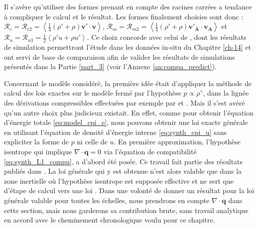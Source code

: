 Il s'avère qu'utiliser des formes prenant en compte des racines carrées a tendance à compliquer le calcul et le résultat. Les formes finalement choisies sont donc : $\mathcal{R}_{c} = \mathcal{R}_{c2} = \left<\frac{1}{4} \left(\rho'+\rho\right) \boldsymbol{v'} \cdot  \boldsymbol{v} \right>$, $\mathcal{R}_{m} = \mathcal{R}_{m2} = \left<\frac{1}{4} \left(\rho'+\rho\right) \boldsymbol{v'_A} \cdot  \boldsymbol{v_A} \right>$ et $\mathcal{R}_{u} = \mathcal{R}_{u3} = \frac{1}{2}\left< \rho' u + \rho u'\right> $. Ce choix concorde avec celui de \cite{andres_energy_2018}, dont les résultats de simulation permettront l'étude dans les données in-situ du Chapitre \ref{ch-14} et ont servi de base de comparaison afin de valider les résultats de simulations présentés dans la Partie \ref{part_3} (voir l'Annexe \ref{an:compa_predict}).

Concernant le modèle considéré, la première idée était d'appliquer la méthode de calcul des lois exactes sur le modèle fermé par l'hypothèse $p \propto \rho^{\gamma}$, dans la lignée des dérivations compressibles effectuées par exemple par \cite{galtier_exact_2011} et \cite{andres_alternative_2017}. Mais il s'est avéré qu'un autre choix plus judicieux existait. En effet, comme pour obtenir l'équation d'énergie totale \eqref{eq:model_cpi_e}, nous pouvons obtenir une loi exacte \og générale \fg{} en utilisant l'équation de densité d'énergie interne \eqref{eq:synth_cpi_u} sans expliciter la forme de $p$ ni celle de $u$. En première approximation, l'hypothèse isentrope qui implique $\nabla \cdot \boldsymbol{q} = 0$ via l'équation de compatibilité \eqref{eq:synth_L1_compu}, a d'abord été posée. Ce travail fait partie des résultats publiés dans \cite{simon_general_2021}. La loi  générale qui y est obtenue n'est alors valable que dans la zone inertielle où l'hypothèse isentrope est supposée effective et ne sert que d'étape de calcul vers une loi . Dans une volonté de donner un résultat pour la loi  générale valable pour toutes les échelles, nous prendrons en compte $\nabla \cdot \boldsymbol{q}$ dans cette section, mais nous garderons sa contribution brute, sans travail analytique en accord avec le cheminement chronologique voulu pour ce chapitre. 

